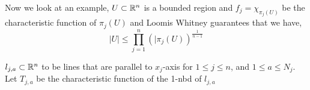 Now we look at an example, $U\subset\mathbb{R}^n$ is a bounded region and $f_j=\chi_{\pi_j(U)}$ be the characteristic function of $\pi_j(U)$ and Loomis Whitney guarantees that we have,
\begin{equation*}
    |U|\leq\prod_{j=1}^n(|\pi_j(U))^{\frac{1}{n-1}}
\end{equation*}

$l_{j,a}\subset\mathbb{R}^n$ to be lines that are parallel to $x_j$-axis for $1\leq j\leq n$, and $1\leq a\leq N_j$. Let $T_{j,a}$ be the characteristic function of the 1-nbd of $l_{j,a}$